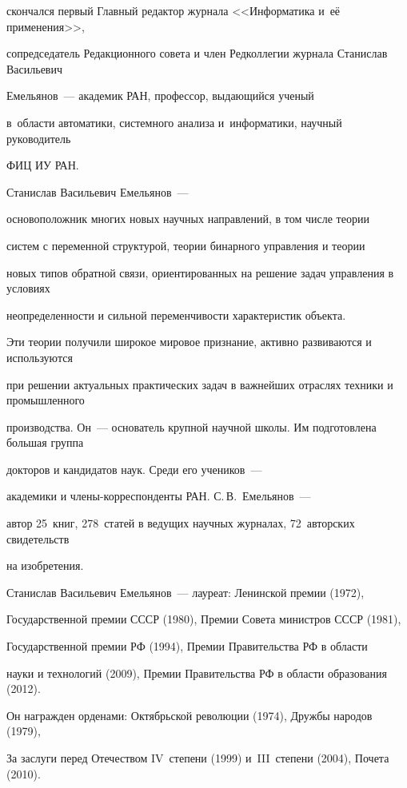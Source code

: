 скончался первый Главный редактор журнала <<Информатика и~её применения>>, 


сопредседатель Редакционного совета и член Редколлегии журнала Станислав Ва\-силь\-евич 


Емельянов~---  академик РАН, профессор, выдающийся ученый 


в~области автоматики, системного анализа и~информатики, научный руководитель 


ФИЦ ИУ РАН. 





Станислав Ва\-силь\-евич Емельянов~--- 


основоположник многих новых научных направлений, в том числе теории 


систем с переменной структурой, теории бинарного управления и теории 


новых типов обратной связи, ориентированных на решение задач управления в условиях 


неопределенности и сильной переменчивости характеристик объекта. 


Эти теории получили широкое мировое признание, активно развиваются и используются 


при решении актуальных практических задач в важнейших отраслях техники и промышленного 


производства. Он~--- основатель крупной научной школы. Им подготовлена большая группа 


докторов и кандидатов наук. Среди его учеников~--- 


академики и чле\-ны-кор\-рес\-пон\-ден\-ты РАН. С.\,В.~Емельянов~--- 


автор 25~книг, 278~статей в ведущих научных журналах, 72~авторских свидетельств 


на изобретения. 





Станислав Васильевич Емельянов~--- лауреат: Ленинской премии (1972), 


Государственной премии СССР (1980), Премии Совета министров СССР (1981), 


Государственной премии РФ (1994), Премии Правительства РФ в области 


науки и технологий (2009), Премии Правительства РФ в области образования (2012). 


Он награжден орденами: Октябрьской революции (1974), Дружбы народов (1979), 


За заслуги перед Отечеством IV~степени (1999) и~III~степени (2004), Почета (2010). 





